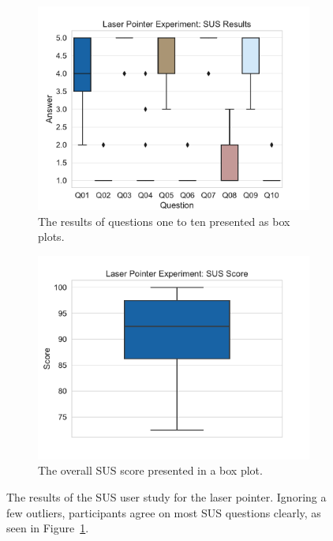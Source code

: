 \begin{figure}[H]
	\centering
	\begin{subfigure}[t]{.48\linewidth}%
		\centering
		\includegraphics[width=\linewidth]{figures/evaluation/res_exp_lp.pdf}
    \caption{The results of questions one to ten presented as box plots.}\label{fig:res-exp-lp}
	\end{subfigure}%
	\hspace{0.04\linewidth}%
	\begin{subfigure}[t]{.48\linewidth}%
		\centering
		\includegraphics[width=\linewidth]{figures/evaluation/score_exp_lp.pdf}
		\caption{The overall \gls{SUS} score presented in a box plot.}\label{fig:score-exp-lp}
	\end{subfigure}%
	\caption[Laser pointer SUS results]{The results of the \gls{SUS} user study for the laser pointer. Ignoring a few outliers, participants agree on most \gls{SUS} questions clearly, as seen in Figure~\ref{fig:res-exp-lp}.}\label{fig:exp-lp-stats}
\end{figure}

